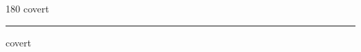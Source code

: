 
\begin{frame}
\begin{center}
\begin{turn}{180}
{\fontsize{2.5cm}{1em}\selectfont covert}
\end{turn}
\vspace{1em}\par  
\hrule
\vspace{1em}\par  
{\fontsize{2.5cm}{1em}\selectfont covert}
\end{center}
\end{frame}
